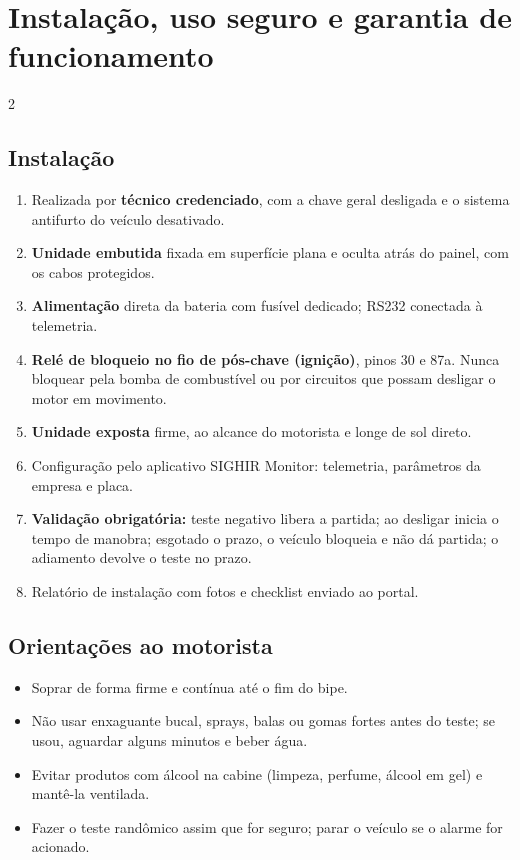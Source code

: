 \documentclass[a4paper,10pt]{article}
\begin{document}
\section{Instalação, uso seguro e garantia de funcionamento}

\begin{multicols}{2}
\subsection{Instalação}
\begin{enumerate}
  \item Realizada por \textbf{técnico credenciado}, com a chave geral desligada e o sistema antifurto do veículo desativado.
  \item \textbf{Unidade embutida} fixada em superfície plana e oculta atrás do painel, com os cabos protegidos.
  \item \textbf{Alimentação} direta da bateria com fusível dedicado; RS232 conectada à telemetria.
  \item \textbf{Relé de bloqueio no fio de pós-chave (ignição)}, pinos 30 e 87a. Nunca bloquear pela bomba de combustível ou por circuitos que possam desligar o motor em movimento.
  \item \textbf{Unidade exposta} firme, ao alcance do motorista e longe de sol direto.
  \item Configuração pelo aplicativo SIGHIR Monitor: telemetria, parâmetros da empresa e placa.
  \item \textbf{Validação obrigatória:} teste negativo libera a partida; ao desligar inicia o tempo de manobra; esgotado o prazo, o veículo bloqueia e não dá partida; o adiamento devolve o teste no prazo.
  \item Relatório de instalação com fotos e checklist enviado ao portal.
\end{enumerate}

\columnbreak
\subsection{Orientações ao motorista}
\begin{itemize}
  \item Soprar de forma firme e contínua até o fim do bipe.
  \item Não usar enxaguante bucal, sprays, balas ou gomas fortes antes do teste; se usou, aguardar alguns minutos e beber água.
  \item Evitar produtos com álcool na cabine (limpeza, perfume, álcool em gel) e mantê-la ventilada.
  \item Fazer o teste randômico assim que for seguro; parar o veículo se o alarme for acionado.
\end{itemize}


\end{multicols}
\end{document}
